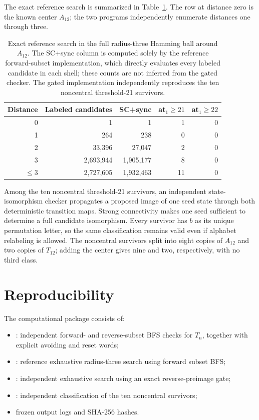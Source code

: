 \documentclass[11pt]{article}
\theoremstyle{definition}
\theoremstyle{remark}
\begin{document}
The exact reference search is summarized in Table~\ref{tab:local}. The row at distance zero is the known center $A_{12}$; the two programs independently enumerate distances one through three.
\begin{table}[h]
\centering
\begin{tabular}{rrrrr}
\toprule
Distance & Labeled candidates & SC+sync & at$_1\ge21$ & at$_1\ge22$\\
\midrule
0 & 1 & 1 & 1 & 0\\
1 & 264 & 238 & 0 & 0\\
2 & 33,396 & 27,047 & 2 & 0\\
3 & 2,693,944 & 1,905,177 & 8 & 0\\
\midrule
$\le3$ & 2,727,605 & 1,932,463 & 11 & 0\\
\bottomrule
\end{tabular}
\caption{Exact reference search in the full radius-three Hamming ball around $A_{12}$. The SC+sync column is computed solely by the reference forward-subset implementation, which directly evaluates every labeled candidate in each shell; these counts are not inferred from the gated checker. The gated implementation independently reproduces the ten noncentral threshold-21 survivors.}
\label{tab:local}
\end{table}

Among the ten noncentral threshold-21 survivors, an independent state-isomorphism checker propagates a proposed image of one seed state through both deterministic transition maps. Strong connectivity makes one seed sufficient to determine a full candidate isomorphism. Every survivor has $b$ as its unique permutation letter, so the same classification remains valid even if alphabet relabeling is allowed. The noncentral survivors split into eight copies of $A_{12}$ and two copies of $T_{12}$; adding the center gives nine and two, respectively, with no third class.

\section{Reproducibility}
The computational package consists of:
\begin{itemize}
\item {}: independent forward- and reverse-subset BFS checks for $T_n$, together with explicit avoiding and reset words;
\item {}: reference exhaustive radius-three search using forward subset BFS;
\item {}: independent exhaustive search using an exact reverse-preimage gate;
\item {}: independent classification of the ten noncentral survivors;
\item frozen output logs and SHA-256 hashes.
\end{itemize}
\end{document}
